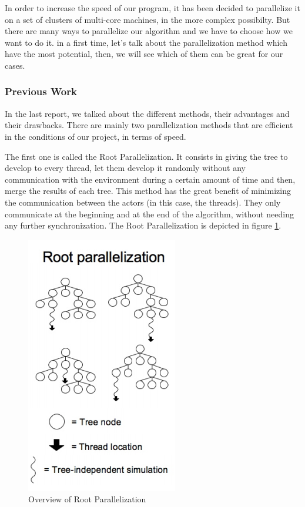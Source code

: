 In order to increase the speed of our program, it has been decided to parallelize it on a set of clusters of multi-core machines, in the more complex possibilty. But there are many ways to parallelize our algorithm and we have to choose how we want to do it. in a first time, let's talk about the parallelization method which have the most potential, then, we will see which of them can be great for our cases.
\subsubsection{Previous Work}
In the last report, we talked about the different methods, their advantages and their drawbacks. There are mainly two parallelization methods that are efficient in the conditions of our project, in terms of speed.

The first one is called the Root Parallelization. It consists in giving the tree to develop to every thread, let them develop it randomly without any communication with the environment
during a certain amount of time and then, merge the results of each tree.
This method has the great benefit of minimizing the communication between the actors (in this case, the threads).
They only communicate at the beginning and at the end of the algorithm, without needing any further synchronization. The Root Parallelization is depicted in figure \ref{fig:root}.

\begin{figure}[!h] 
\centerline{\includegraphics[scale=0.60]{3Methods/3.1Parallelization_Method/root.png}}
   \caption{Overview of Root Parallelization}
\label{fig:root}
\end{figure}


